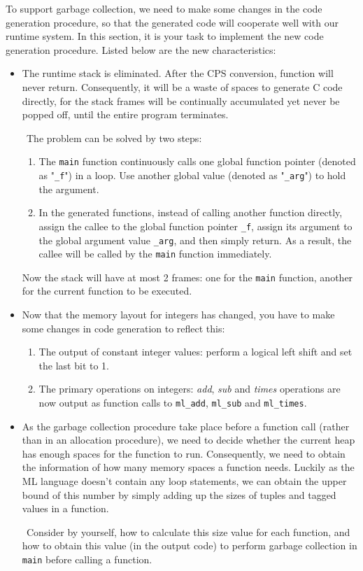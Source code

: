 \documentclass{article}
\theoremstyle{definition}
\theoremstyle{remark}
\numberwithin{equation}{section}
\begin{document}
To support garbage collection, we need to make some changes in the code
generation procedure, so that the generated code will cooperate well
with our runtime system. In this section, it is your task to implement the
new code generation procedure. Listed below are the new characteristics:
\begin{itemize}
  \item The runtime stack is eliminated. After the CPS conversion, function
  will never return. Consequently, it will be a waste of spaces to generate
  C code directly, for the stack frames will be continually accumulated
  yet never be popped off, until the entire program terminates.

  $\ \ $The problem can be solved by two steps:
  \begin{enumerate}
    \item The \texttt{main} function continuously calls one global function pointer
    (denoted as "\texttt{\_f}") in a loop. Use another global value (denoted as
    "\texttt{\_arg}") to hold the argument.
    \item In the generated functions, instead of calling another function directly,
    assign the callee to the global function pointer \texttt{\_f}, assign its
    argument to the global argument value \texttt{\_arg}, and then simply return.
    As a result, the callee will be called by the \texttt{main} function immediately.
  \end{enumerate}
    Now the stack will have at most 2 frames: one for the \texttt{main}
    function, another for the current function to be executed.
  \item Now that the memory layout for integers has changed, you have to make some changes
  in code generation to reflect this:
  \begin{enumerate}
    \item The output of constant integer values: perform a logical left shift and set
    the last bit to 1.
    \item The primary operations on integers: \textit{add}, \emph{sub} and \emph{times}
    operations are now output as function calls to \texttt{ml\_add}, \texttt{ml\_sub} and
     \texttt{ml\_times}.
  \end{enumerate}
  \item As the garbage collection procedure take place before a function call (rather than
  in an allocation procedure), we need to decide whether the current heap has enough spaces
  for the function to run. Consequently, we need to obtain the information of how many
  memory spaces a function needs. Luckily as the ML language doesn't contain
  any loop statements, we can obtain the upper bound of this number by simply adding up the
  sizes of tuples and tagged values in a function.

  $\ \ $Consider by yourself, how to calculate this size value for each function, and how 
  to obtain this value
  (in the output code) to perform garbage collection in \texttt{main}  before
   calling a function.
\end{itemize}
\end{document}
